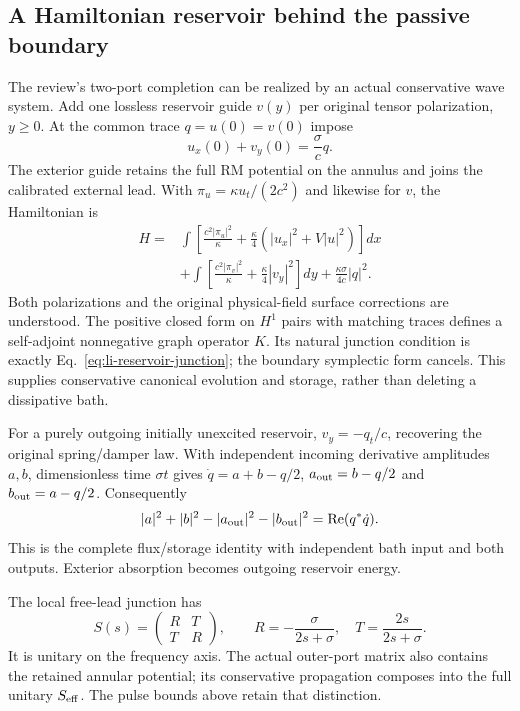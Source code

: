 \documentclass[10pt,twocolumn,letterpaper]{article}
\begin{document}
\subsection{A Hamiltonian reservoir behind the passive boundary}
The review's two-port completion can be realized by an actual conservative
wave system. Add one lossless reservoir guide $v(y)$ per original tensor
polarization, $y\geq0$. At the common trace $q=u(0)=v(0)$ impose
\begin{equation}
 u_x(0)+v_y(0)=\frac\sigma c q.
 \label{eq:li-reservoir-junction}
\end{equation}
The exterior guide retains the full RM potential on the annulus and joins
the calibrated external lead. With
$\pi_u=\kappa u_t/(2c^2)$ and likewise for $v$, the Hamiltonian is
\begin{equation}
\begin{split}
 H={}&\int\left[\frac{c^2|\pi_u|^2}{\kappa}
       +\frac\kappa4(|u_x|^2+V|u|^2)\right]dx\\
 &+\int\left[\frac{c^2|\pi_v|^2}{\kappa}
                +\frac\kappa4|v_y|^2\right]dy
       +\frac{\kappa\sigma}{4c}|q|^2.
\end{split}
\label{eq:li-reservoir-H}
\end{equation}
Both polarizations and the original physical-field surface corrections are
understood. The positive closed form on $H^1$ pairs with matching traces
defines a self-adjoint nonnegative graph operator $K$. Its natural
junction condition is exactly Eq.~\eqref{eq:li-reservoir-junction}; the
boundary symplectic form cancels. This supplies conservative canonical
evolution and storage, rather than deleting a dissipative bath.

For a purely outgoing initially unexcited reservoir,
$v_y=-q_t/c$, recovering the original spring/damper law. With independent
incoming derivative amplitudes $a,b$, dimensionless time $\sigma t$ gives
$\dot q=a+b-q/2$, $a_{\rm out}=b-q/2$ and
$b_{\rm out}=a-q/2$. Consequently
\begin{equation}
 |a|^2+|b|^2-|a_{\rm out}|^2-|b_{\rm out}|^2
                 =\operatorname{Re}(q^*\dot q).
\end{equation}
This is the complete flux/storage identity with independent bath input and
both outputs. Exterior absorption becomes outgoing reservoir energy.

The local free-lead junction has
\begin{equation}
 S(s)=\begin{pmatrix}R&T\\T&R\end{pmatrix},\qquad
 R=-\frac\sigma{2s+\sigma},\quad T=\frac{2s}{2s+\sigma}.
\end{equation}
It is unitary on the frequency axis. The actual outer-port matrix also
contains the retained annular potential; its conservative propagation
composes into the full unitary $S_{\rm eff}$. The pulse bounds above
retain that distinction.
\end{document}
